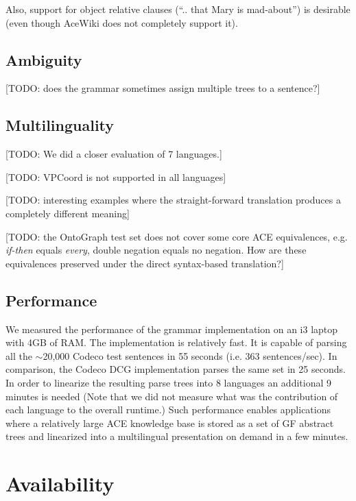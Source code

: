 \documentclass[a4paper]{article}
\begin{document}
Also, support for object relative clauses (``.. that Mary is mad-about'')
is desirable (even though AceWiki does not completely support it).


\subsection{Ambiguity}

[TODO: does the grammar sometimes assign multiple trees to a sentence?]

\subsection{Multilinguality}

[TODO: We did a closer evaluation of 7 languages.]

[TODO: VPCoord is not supported in all languages]

[TODO: interesting examples where the straight-forward translation produces
a completely different meaning]

[TODO: the OntoGraph test set does not cover some core ACE equivalences,
e.g. \emph{if-then} equals \emph{every}, double negation equals no negation.
How are these equivalences preserved under the direct syntax-based
translation?]

\subsection{Performance}

We measured the performance of the grammar implementation on an i3 laptop
with 4GB of RAM.
The implementation is relatively fast. It is capable of parsing
all the $\sim$20,000 Codeco test sentences in 55 seconds
(i.e. 363 sentences/sec). In comparison, the Codeco DCG implementation parses
the same set in 25 seconds.
In order to linearize the
resulting parse trees into 8 languages an additional 9 minutes is needed
(Note that we did not measure what was
the contribution of each language to the overall runtime.)
Such performance enables applications where a relatively large ACE knowledge
base is stored as a set of GF abstract trees and linearized into a
multilingual presentation on demand in a few minutes.


\section{Availability}
\end{document}
